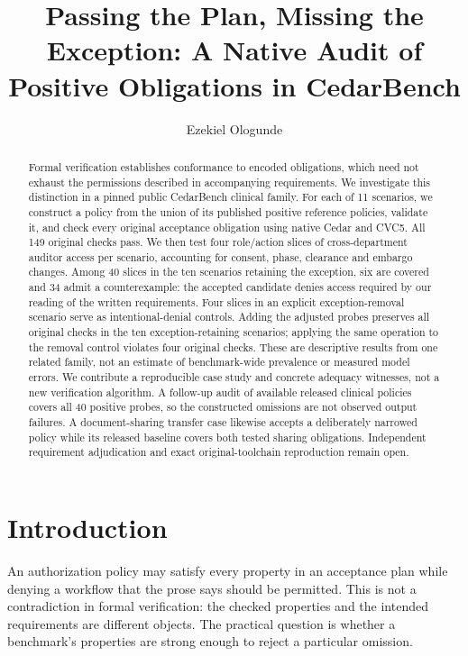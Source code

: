 \documentclass[sigconf,nonacm]{acmart}
\title{Passing the Plan, Missing the Exception: A Native Audit of Positive Obligations in CedarBench}
\author{Ezekiel Ologunde}
\affiliation{\institution{Independent Researcher}\city{Boston}\state{MA}\country{USA}}
\begin{document}
\begin{abstract}
Formal verification establishes conformance to encoded obligations, which need not exhaust the permissions described in accompanying requirements. We investigate this distinction in a pinned public CedarBench clinical family. For each of 11 scenarios, we construct a policy from the union of its published positive reference policies, validate it, and check every original acceptance obligation using native Cedar and CVC5. All 149 original checks pass. We then test four role/action slices of cross-department auditor access per scenario, accounting for consent, phase, clearance and embargo changes. Among 40 slices in the ten scenarios retaining the exception, six are covered and 34 admit a counterexample: the accepted candidate denies access required by our reading of the written requirements. Four slices in an explicit exception-removal scenario serve as intentional-denial controls. Adding the adjusted probes preserves all original checks in the ten exception-retaining scenarios; applying the same operation to the removal control violates four original checks. These are descriptive results from one related family, not an estimate of benchmark-wide prevalence or measured model errors. We contribute a reproducible case study and concrete adequacy witnesses, not a new verification algorithm. A follow-up audit of available released clinical policies covers all 40 positive probes, so the constructed omissions are not observed output failures. A document-sharing transfer case likewise accepts a deliberately narrowed policy while its released baseline covers both tested sharing obligations. Independent requirement adjudication and exact original-toolchain reproduction remain open.
\end{abstract}
\maketitle

\section{Introduction}
An authorization policy may satisfy every property in an acceptance plan while denying a workflow that the prose says should be permitted. This is not a contradiction in formal verification: the checked properties and the intended requirements are different objects. The practical question is whether a benchmark's properties are strong enough to reject a particular omission.
\end{document}
